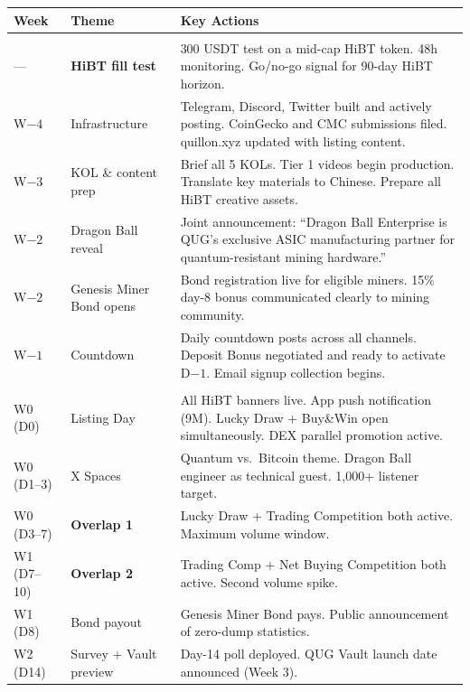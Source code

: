 \documentclass[11pt,a4paper]{article}
\begin{document}
\begin{center}
\begin{longtable}{C{2cm} L{4cm} L{8cm}}
  \toprule
  \textbf{Week} & \textbf{Theme} & \textbf{Key Actions} \\
  \midrule
  \endhead\bottomrule\endfoot

   \\
  --- & \textbf{HiBT fill test} & 300 USDT test on a mid-cap HiBT token. 48h monitoring. Go/no-go signal for 90-day HiBT horizon. \\
  W$-4$ & Infrastructure & Telegram, Discord, Twitter built and actively posting. CoinGecko and CMC submissions filed. quillon.xyz updated with listing content. \\
  W$-3$ & KOL \& content prep & Brief all 5 KOLs. Tier 1 videos begin production. Translate key materials to Chinese. Prepare all HiBT creative assets. \\
  W$-2$ & Dragon Ball reveal & Joint announcement: ``Dragon Ball Enterprise is QUG's exclusive ASIC manufacturing partner for quantum-resistant mining hardware.'' \\
  W$-2$ & Genesis Miner Bond opens & Bond registration live for eligible miners. 15\% day-8 bonus communicated clearly to mining community. \\
  W$-1$ & Countdown & Daily countdown posts across all channels. Deposit Bonus negotiated and ready to activate D$-1$. Email signup collection begins. \\

   \\
  W0 (D0) & Listing Day & All HiBT banners live. App push notification (9M). Lucky Draw + Buy\&Win open simultaneously. DEX parallel promotion active. \\
  W0 (D1--3) & X Spaces & Quantum vs.\ Bitcoin theme. Dragon Ball engineer as technical guest. 1,000+ listener target. \\
  W0 (D3--7) & \textbf{Overlap 1} & Lucky Draw + Trading Competition both active. Maximum volume window. \\
  W1 (D7--10) & \textbf{Overlap 2} & Trading Comp + Net Buying Competition both active. Second volume spike. \\
  W1 (D8) & Bond payout & Genesis Miner Bond pays. Public announcement of zero-dump statistics. \\
  W2 (D14) & Survey + Vault preview & Day-14 poll deployed. QUG Vault launch date announced (Week 3). \\


\end{longtable}
\end{center}
\end{document}
